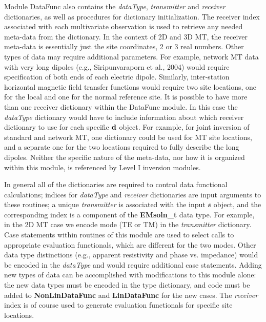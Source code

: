 Module DataFunc also contains the {\it dataType}, {\it transmitter}
and {\it receiver} dictionaries,
as well as procedures for dictionary initialization.
The receiver index associated with each multivariate observation
is used to retrieve any needed meta-data from the dictionary.
In the context of 2D and 3D MT, the receiver meta-data is
essentially just the site coordinates, 2 or 3  real numbers.
Other types of data may require additional parameters.
For example, network MT data
with very long dipoles (e.g., Siripunvaraporn et al., 2004)
would require specification of both ends of each
electric dipole.  Similarly,
inter-station horizontal magnetic field transfer functions
would require two site locations, one for the local and one
for the normal reference site.
It is possible to have more than one receiver dictionary
within the DataFunc module.   In this case the {\it dataType} dictionary 
would have to include information about which receiver dictionary to use
for each specific ${\bf d}$ object.  For example, for joint inversion of
standard and network MT, one
dictionary could be used for MT site locations, and
a separate one for the two locations required to
fully describe the long dipoles.  
Neither the specific nature of the meta-data,
nor how it is organized within this module,
is referenced by Level I inversion modules.

In general all of the dictionaries are required to control
data functional calculations; indices for {\em dataType}
and {\em receiver} dictionaries are input arguments to these
routines; a unique {\em transmitter} is associated
with the input $\ee$ object, and the corresponding index
is a component of the {\bf EMsoln\_t} data type.
For example, in the 2D MT case we encode
mode (TE or TM) in the {\it transmitter} dictionary.  Case statements
within routines of this module are used to select calls to appropriate
evaluation functionals, which are different for the two modes.
Other data type distinctions (e.g., apparent resistivity and
phase vs. impedance) would be encoded in the {\em dataType}
and would require additional case statements.
Adding new types of data can be accomplished with
modifications to this module alone: the new data types must
be encoded in the type dictionary, and code must be added
to {\bf NonLinDataFunc} and {\bf LinDataFunc} for the new cases.
The {\em receiver} index is of course used to generate
evaluation functionals for specific site locations.

